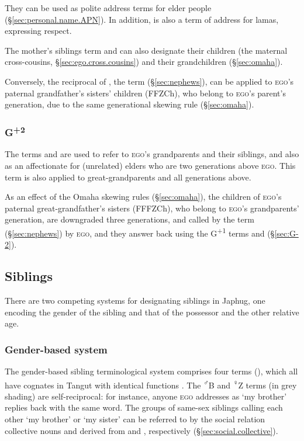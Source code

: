 They can be used as polite address terms for elder people (§\ref{sec:personal.name.APN}). In addition,  is also a term of address for lamas, expressing respect.

The mother's siblings term  and   can also designate their children (the maternal cross-cousins, §\ref{sec:ego.cross.cousins}) and their grandchildren (§\ref{sec:omaha}).

Conversely, the reciprocal of , the term  (§\ref{sec:nephews}), can be applied to \textsc{ego}'s paternal grandfather's sisters' children (FFZCh), who belong to \textsc{ego}'s parent's generation, due to the same generational skewing rule (§\ref{sec:omaha}).

\subsubsection{G\textsuperscript{+2}} \label{sec:G+2}
The terms  and  are used to refer to \textsc{ego}'s grandparents and their siblings, and also as an affectionate for (unrelated) elders who are two generations above \textsc{ego}. This term is also applied to great-grandparents and all generations above.

As an effect of the Omaha skewing rules (§\ref{sec:omaha}), the children of \textsc{ego}'s paternal great-grandfather's sisters (FFFZCh), who belong to \textsc{ego}'s grandparents' generation, are downgraded three generations, and called by the term  (§\ref{sec:nephews}) by \textsc{ego}, and they answer back using the G\textsuperscript{+1} terms  and   (§\ref{sec:G-2}).

\subsection{Siblings} \label{sec:siblings}
There are two competing systems for designating siblings in Japhug, one encoding the gender of the sibling and that of the possessor and the other relative age.



\subsubsection{Gender-based system} \label{sec:siblings.gender}
The gender-based sibling terminological system comprises four terms (), which all have cognates in Tangut with identical functions \citep{jacques11kinship}. The \textsuperscript{♂}B and \textsuperscript{♀}Z terms (in grey shading) are self-reciprocal: for instance, anyone \textsc{ego} addresses as  `my brother' replies back with the same word. The groups of same-sex siblings calling each other  `my brother' or  `my sister' can be referred to by the social relation collective nouns  and  derived from  and , respectively  (§\ref{sec:social.collective}).

